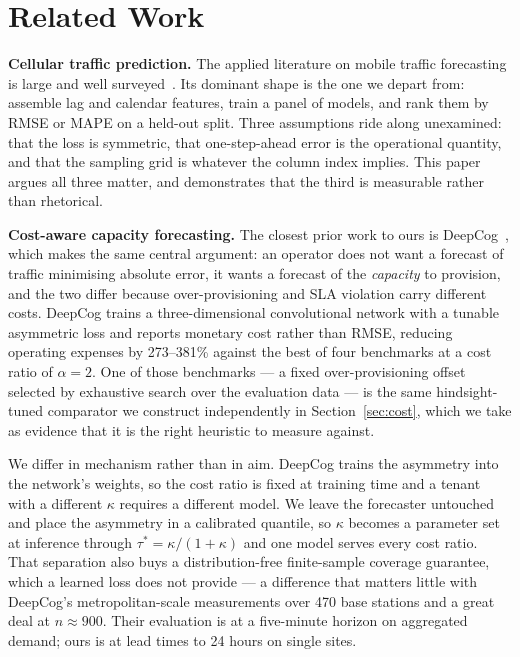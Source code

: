 \documentclass[conference]{IEEEtran}
\begin{document}
\section{Related Work}

\textbf{Cellular traffic prediction.} The applied literature on mobile traffic
forecasting is large and well surveyed~\cite{wang2024survey}. Its dominant shape is the
one we depart from: assemble lag and calendar features, train a panel of models, and
rank them by RMSE or MAPE on a held-out split. Three assumptions ride along unexamined:
that the loss is symmetric, that one-step-ahead error is the operational quantity, and
that the sampling grid is whatever the column index implies. This paper argues all
three matter, and demonstrates that the third is measurable rather than rhetorical.

\textbf{Cost-aware capacity forecasting.} The closest prior work to ours is
DeepCog~\cite{bega2019deepcog,bega2020deepcog}, which makes the same central argument:
an operator does not want a forecast of traffic minimising absolute error, it wants a
forecast of the \emph{capacity} to provision, and the two differ because
over-provisioning and SLA violation carry different costs. DeepCog trains a
three-dimensional convolutional network with a tunable asymmetric loss and reports
monetary cost rather than RMSE, reducing operating expenses by 273--381\% against the
best of four benchmarks at a cost ratio of $\alpha = 2$. One of those benchmarks --- a
fixed over-provisioning offset selected by exhaustive search over the evaluation data
--- is the same hindsight-tuned comparator we construct independently in
Section~\ref{sec:cost}, which we take as evidence that it is the right heuristic to
measure against.

We differ in mechanism rather than in aim. DeepCog trains the asymmetry into the
network's weights, so the cost ratio is fixed at training time and a tenant with a
different $\kappa$ requires a different model. We leave the forecaster untouched and
place the asymmetry in a calibrated quantile, so $\kappa$ becomes a parameter set at
inference through $\tau^{*} = \kappa/(1+\kappa)$ and one model serves every cost ratio.
That separation also buys a distribution-free finite-sample coverage guarantee, which a
learned loss does not provide --- a difference that matters little with DeepCog's
metropolitan-scale measurements over 470 base stations and a great deal at
$n \approx 900$. Their evaluation is at a five-minute horizon on aggregated demand;
ours is at lead times to 24 hours on single sites.
\end{document}
